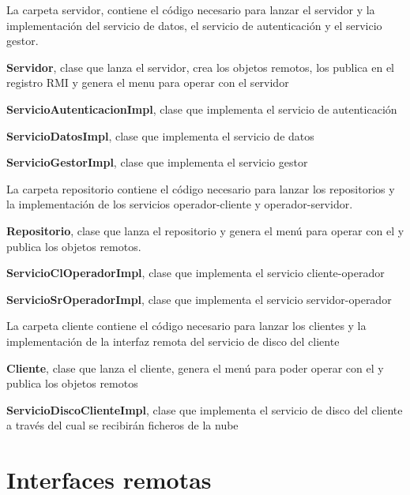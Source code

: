 La carpeta servidor, contiene el código necesario para lanzar el servidor y la implementación del servicio de datos, el servicio de autenticación y el servicio gestor.
\begin{compactitem}
	\item \textbf{Servidor}, clase que lanza el servidor, crea los objetos remotos, los publica en el registro RMI y genera el menu para operar con el servidor
	\item \textbf{ServicioAutenticacionImpl}, clase que implementa el servicio de autenticación
	\item \textbf{ServicioDatosImpl}, clase que implementa el servicio de datos
	\item \textbf{ServicioGestorImpl}, clase que implementa el servicio gestor
\end{compactitem}

La carpeta repositorio contiene el código necesario para lanzar los repositorios y la implementación de los servicios operador-cliente y operador-servidor.

\begin{compactitem}
	\item \textbf{Repositorio}, clase que lanza el repositorio y genera el menú para operar con el y publica los objetos remotos.
	\item \textbf{ServicioClOperadorImpl}, clase que implementa el servicio cliente-operador
	\item \textbf{ServicioSrOperadorImpl}, clase que implementa el servicio servidor-operador
\end{compactitem}

La carpeta cliente contiene el código necesario para lanzar los clientes y la implementación de la interfaz remota del servicio de disco del cliente

\begin{compactitem}
	\item \textbf{Cliente}, clase que lanza el cliente, genera el menú para poder operar con el y publica los objetos remotos
	\item \textbf{ServicioDiscoClienteImpl}, clase que implementa el servicio de disco del cliente a través del cual se recibirán ficheros de la nube
\end{compactitem}

\section{Interfaces remotas}


